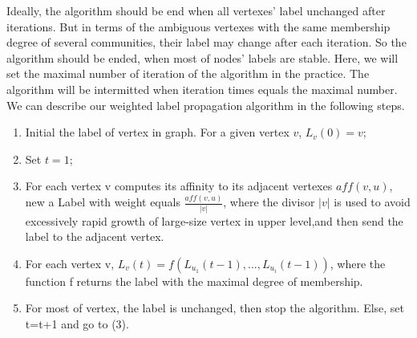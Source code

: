 \documentclass{acm_proc_article-sp}
\begin{document}
Ideally, the algorithm should be end when all vertexes' label unchanged after iterations. But in terms of the ambiguous vertexes with the same membership degree of several communities, their label may change after each iteration. So the algorithm should be ended, when most of nodes' labels are stable. Here, we will set the maximal number of iteration of the algorithm in the practice. The algorithm will be intermitted when iteration times equals the maximal number. We can describe our weighted label propagation algorithm in the following steps.
    \begin{enumerate}
\renewcommand{\labelenumi}{(\theenumi)}
\item Initial the label of vertex in graph. For a given vertex $v$, $L_v (0)=v$;
\item Set $t=1$;
\item For each vertex v computes its affinity to its adjacent vertexes $aff (v,u)$, new a Label with weight equals $ \frac{aff (v,u)}{|v|}$, where the divisor $|v|$ is used to avoid excessively rapid growth of large-size vertex in upper level,and then send the label to the adjacent vertex.
\item For each vertex v, $L_{v}(t)=f(L_{u_{1}}(t-1),...,L_{u_{i}}(t-1))$, where the function f returns the label with the maximal degree of membership.
\item For most of vertex, the label is unchanged, then stop the algorithm. Else, set t=t+1 and go to (3).
\end{enumerate}
\end{document}
